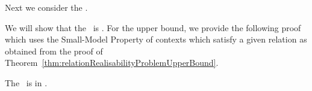 Next we consider the \atomicTypecheckingProblemFull.
\begin{problem}
    \problemtitle{\atomicTypecheckingProblemFull}
\end{problem}

We will show that the \atomicTypecheckingProblemFull\ is \exptc. For the upper bound, we provide the following proof which uses the Small-Model Property of contexts which satisfy a given relation as obtained from the proof of Theorem~\ref{thm:relationRealisabilityProblemUpperBound}.

\begin{theorem}
    The \atomicTypecheckingProblemFull\ is in \expt.
\end{theorem}

